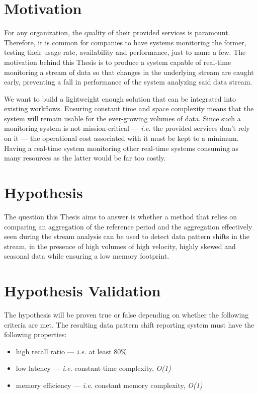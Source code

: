 \section{Motivation} \label{sec:motivation}
For any organization, the quality of their provided services is paramount. Therefore, it is common for companies to have systems monitoring the former, testing their usage rate, availability and performance, just to name a few. The motivation behind this Thesis is to produce a system capable of real-time monitoring a stream of data so that changes in the underlying stream are caught early, preventing a fall in performance of the system analyzing said data stream. 

We want to build a lightweight enough solution that can be integrated into existing workflows. Ensuring constant time and space complexity means that the system will remain usable for the ever-growing volumes of data. Since such a monitoring system is not mission-critical --- \textit{i.e.} the provided services don't rely on it --- the operational cost associated with it must be kept to a minimum. Having a real-time system monitoring other real-time systems consuming as many resources as the latter would be far too costly.


\section{Hypothesis} \label{sec:hypothesis}

The question this Thesis aims to answer is whether a method that relies on comparing an aggregation of the reference period and the aggregation effectively seen during the stream analysis can be used to detect data pattern shifts in the stream, in the presence of high volumes of high velocity, highly skewed and seasonal data while ensuring a low memory footprint.

\section{Hypothesis Validation} \label{sec:validation}
The hypothesis will be proven true or false depending on whether the following criteria are met. The resulting data pattern shift reporting system must have the following properties:
\begin{itemize}
    \item high recall ratio --- \textit{i.e.} at least 80\%
    \item low latency --- \textit{i.e.} constant time complexity, \textit{O(1)}
    \item memory efficiency --- \textit{i.e.} constant memory complexity, \textit{O(1)}
\end{itemize}

